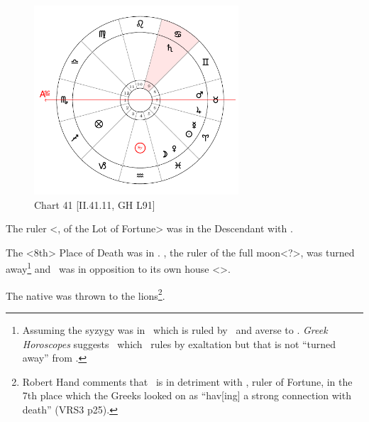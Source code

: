 \clearpage
\begin{figure}
\centering
\vspace{-20pt}
\includegraphics[width=0.68\textwidth]{charts/2_41_11}
\caption{Chart 41 [II.41.11, GH L91]}
\label{fig:chart41}
\end{figure} 

The ruler <\Jupiter, of the Lot of Fortune> was in the Descendant with \Mars. 

The <8th> Place of Death was in \Cancer. \Saturn, the ruler of the full moon<?>, was turned away\footnote{Assuming the syzygy was in \Aquarius\, which is ruled by \Saturn\, and averse to \Cancer. \textsl{Greek Horoscopes} suggests \Libra\, which \Saturn\, rules by exaltation but that is not ``turned away'' from \Cancer.} and \Mars\, was in opposition to its own house <\Scorpio>. 

The native was thrown to the lions\footnote{Robert Hand comments that \Mars\, is in detriment with \Jupiter, ruler of Fortune, in the 7th place which the Greeks looked on as ``hav[ing] a strong connection with death'' (VRS3 p25).}.
\newpage
